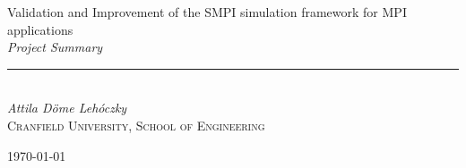 \begin{titlepage}
\begin{center}

\LARGE{Validation and Improvement of the SMPI simulation framework for
MPI applications}\\[0.8cm]
\emph{\large{Project Summary}}\\[0.5cm]
\rule{\linewidth}{0.5mm}\\[1.5cm]
\emph{\normalsize{Attila Döme Lehóczky}}\\[0.5cm]
\textsc{\normalsize{Cranfield University, School of Engineering}}

\vfill

{\large \today}

\end{center}
\end{titlepage}
